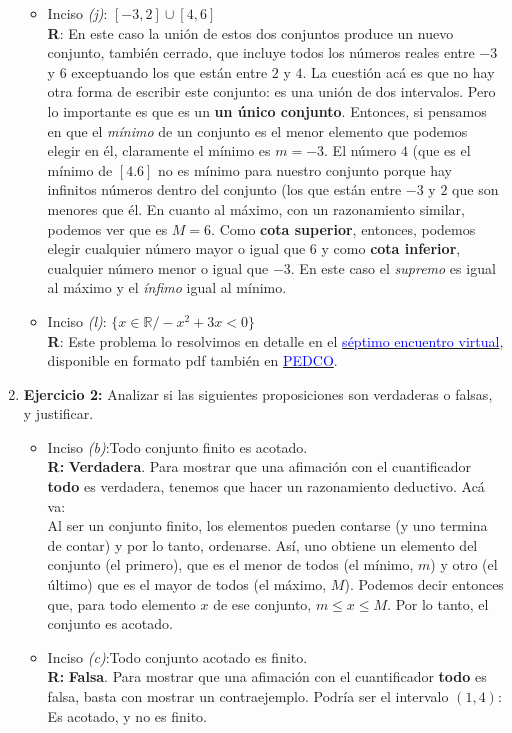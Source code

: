 \documentclass[12pt]{article}
\theoremstyle{definition}
\begin{document}
\begin{enumerate}
\begin{itemize}
\item  Inciso \textit{(j)}:  $[-3,2] \cup [4, 6]$\\
\textbf{R}: En este caso la unión de estos dos conjuntos produce un nuevo conjunto, también cerrado, que incluye todos los números reales entre $-3$ y $6$ exceptuando los que están entre $2$ y $4$. La cuestión acá es que no hay otra forma de escribir este conjunto: es una unión de dos intervalos. Pero lo importante es que es un \textbf{un único conjunto}. Entonces, si pensamos en que el \textit{mínimo} de un conjunto es el menor elemento que podemos elegir en él, claramente el mínimo es $m = -3$. El número $4$ (que es el mínimo de $[4.6]$ no es mínimo para nuestro conjunto porque hay infinitos números dentro del conjunto (los que están entre $-3$ y $2$ que son menores que él. En cuanto al máximo, con un razonamiento similar, podemos ver que es $M = 6$. Como  \textbf{cota superior}, entonces, podemos elegir cualquier número mayor o igual que $6$ y como  \textbf{cota inferior}, cualquier número menor o igual que $-3$. En este caso el \textit{supremo} es igual al máximo y el \textit{ínfimo} igual al mínimo.

\item  Inciso \textit{(l)}: $\{x \in \mathbb{R} / -x^2+ 3x < 0\}$\\
\textbf{R}: Este problema lo resolvimos en detalle en el  \href{https://youtu.be/yQe628PPYpU}{\textcolor{blue}{ séptimo encuentro virtual}}, disponible en formato pdf también en \href{https://pedco.uncoma.edu.ar/}{\textcolor{blue}{ PEDCO}}.
\end{itemize}

\item \textbf{Ejercicio 2:} Analizar si las siguientes proposiciones son verdaderas o falsas, y justificar.
\begin{itemize}
\setlength\itemsep{0em}
\item Inciso \textit{(b)}:Todo conjunto finito es acotado. \\
\textbf{R:} \textbf{Verdadera}. Para mostrar que una afimación con el cuantificador \textbf{todo} es verdadera, tenemos que hacer un razonamiento deductivo. Acá va:\\
Al ser un conjunto finito, los elementos pueden contarse (y uno termina de contar) y por lo tanto, ordenarse. Así, uno obtiene un elemento del conjunto (el primero), que es el menor de todos (el mínimo, $m$) y otro (el último) que es el mayor de todos (el máximo, $M$). Podemos decir entonces que, para todo elemento $x$ de ese conjunto, $m \leq x \leq M$. Por lo tanto, el conjunto es acotado.
\item Inciso \textit{(c)}:Todo conjunto acotado es finito.\\
\textbf{R:} \textbf{Falsa}. Para mostrar que una afimación con el cuantificador \textbf{todo} es falsa, basta con mostrar un contraejemplo. Podría ser el intervalo $(1,4)$: Es acotado, y no es finito. 
\end{itemize}


\end{enumerate}
\end{document}
